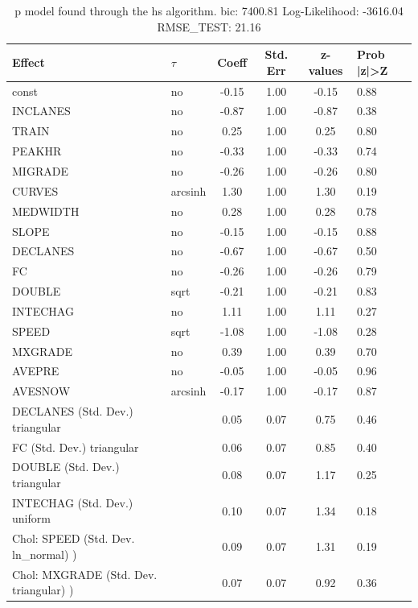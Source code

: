 \begin{table}
	\caption{p model found through the hs algorithm. bic: 7400.81 Log-Likelihood: -3616.04 RMSE_TEST: 21.16}
	\begin{center}
		\begin{tabular}{|l|l|c|c|c|l|}
			\hline
			Effect & $\tau$ & Coeff & Std. Err & z-values & Prob |z|>Z \\
			\hline
			const & no & -0.15 & 1.00 & -0.15 & 0.88 \\
			\hline
			INCLANES & no & -0.87 & 1.00 & -0.87 & 0.38 \\
			\hline
			TRAIN & no & 0.25 & 1.00 & 0.25 & 0.80 \\
			\hline
			PEAKHR & no & -0.33 & 1.00 & -0.33 & 0.74 \\
			\hline
			MIGRADE & no & -0.26 & 1.00 & -0.26 & 0.80 \\
			\hline
			CURVES & arcsinh & 1.30 & 1.00 & 1.30 & 0.19 \\
			\hline
			MEDWIDTH & no & 0.28 & 1.00 & 0.28 & 0.78 \\
			\hline
			SLOPE & no & -0.15 & 1.00 & -0.15 & 0.88 \\
			\hline
			DECLANES & no & -0.67 & 1.00 & -0.67 & 0.50 \\
			\hline
			FC & no & -0.26 & 1.00 & -0.26 & 0.79 \\
			\hline
			DOUBLE & sqrt & -0.21 & 1.00 & -0.21 & 0.83 \\
			\hline
			INTECHAG & no & 1.11 & 1.00 & 1.11 & 0.27 \\
			\hline
			SPEED & sqrt & -1.08 & 1.00 & -1.08 & 0.28 \\
			\hline
			MXGRADE & no & 0.39 & 1.00 & 0.39 & 0.70 \\
			\hline
			AVEPRE & no & -0.05 & 1.00 & -0.05 & 0.96 \\
			\hline
			AVESNOW & arcsinh & -0.17 & 1.00 & -0.17 & 0.87 \\
			\hline
			DECLANES (Std. Dev.) triangular &  & 0.05 & 0.07 & 0.75 & 0.46 \\
			\hline
			FC (Std. Dev.) triangular &  & 0.06 & 0.07 & 0.85 & 0.40 \\
			\hline
			DOUBLE (Std. Dev.) triangular &  & 0.08 & 0.07 & 1.17 & 0.25 \\
			\hline
			INTECHAG (Std. Dev.) uniform &  & 0.10 & 0.07 & 1.34 & 0.18 \\
			\hline
			 Chol: SPEED (Std. Dev. ln_normal) ) &  & 0.09 & 0.07 & 1.31 & 0.19 \\
			\hline
			 Chol: MXGRADE (Std. Dev. triangular) ) &  & 0.07 & 0.07 & 0.92 & 0.36 \\

\end{tabular}
\end{center}
\end{table}
